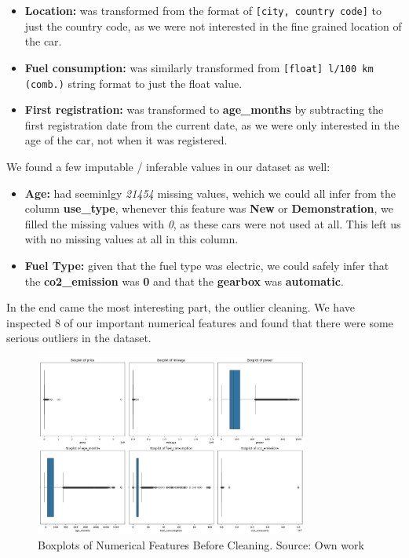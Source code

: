 \documentclass[12pt]{article}
\begin{document}
\begin{itemize}
  \item \textbf{Location:} was transformed from the format of \texttt{[city, country code]} to just the country code, as we were not interested in the fine grained location of the car.
  \item \textbf{Fuel consumption:} was similarly transformed from \texttt{[float] l/100 km (comb.)} string format to just the float value.
  \item \textbf{First registration:} was transformed to \textbf{age\_months} by subtracting the first registration date from the current date, as we were only interested in the age of the car, not when it was registered.
\end{itemize}

We found a few imputable / inferable values in our dataset as well:

\begin{itemize}
  \item \textbf{Age:} had seeminlgy \textit{21454} missing values, wehich we could all infer from the column \textbf{use\_type}, whenever this feature was \textbf{New} or \textbf{Demonstration}, we filled the missing values with \textit{0}, as these cars were not used at all. This left us with no missing values at all in this column.
  \item \textbf{Fuel Type:} given that the fuel type was electric, we could safely infer that the \textbf{co2\_emission} was \textbf{0} and that the \textbf{gearbox} was \textbf{automatic}.
\end{itemize}

In the end came the most interesting part, the outlier cleaning. We have inspected 8 of our important numerical features and found that there were some serious outliers in the dataset.

\begin{figure}[ht]
  \centering
  \includegraphics[width=0.8\textwidth]{./images/boxplots_before.png}
  \caption{Boxplots of Numerical Features Before Cleaning. Source: Own work}
  \label{fig:boxplots_before}
\end{figure}
\end{document}
